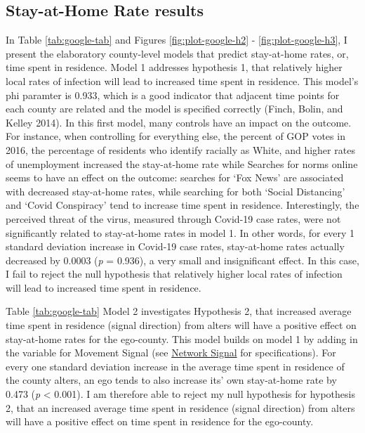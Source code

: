 \hypertarget{stay-at-home-rate-results}{%
\subsection{Stay-at-Home Rate results}\label{stay-at-home-rate-results}}




In Table \ref{tab:google-tab} and Figures \ref{fig:plot-google-h2} -
\ref{fig:plot-google-h3}, I present the elaboratory county-level models that
predict stay-at-home rates, or, time spent in residence. Model 1 addresses
hypothesis 1, that relatively higher local rates of infection will lead to
increased time spent in residence. This model's phi paramter is 0.933, which is
a good indicator that adjacent time points for each county are related and the
model is specified correctly (Finch, Bolin, and Kelley 2014). In this first model, many controls
have an impact on the outcome. For instance, when controlling for everything
else, the percent of GOP votes in 2016, the percentage of residents who identify
racially as White, and higher rates of unemployment increased the stay-at-home
rate while Searches for norms online seems to
have an effect on the outcome: searches for `Fox News' are associated with
decreased stay-at-home rates, while searching for both `Social Distancing' and
`Covid Conspiracy' tend to increase time spent in residence. Interestingly, the
perceived threat of the virus, measured through Covid-19 case rates, were not
significantly related to stay-at-home rates in model 1. In other words, for
every 1 standard deviation increase in Covid-19 case rates, stay-at-home rates
actually decreased by
0.0003 (\emph{p} = 0.936),
a very small and insignificant effect. In this case, I fail to reject the null
hypothesis that relatively higher local rates of infection will lead to
increased time spent in residence.

Table \ref{tab:google-tab} Model 2 investigates Hypothesis 2, that increased
average time spent in residence (signal direction) from alters will have a
positive effect on stay-at-home rates for the ego-county. This model builds on
model 1 by adding in the variable for Movement Signal (see \protect\hyperlink{network-signal}{Network
Signal} for specifications). For every one standard deviation
increase in the average time spent in residence of the county alters, an ego tends to also increase its' own stay-at-home rate by
0.473
(\emph{p} \textless{} 0.001). I am therefore able to reject my null hypothesis for hypothesis
2, that an increased average time spent in residence (signal direction) from
alters will have a positive effect on time spent in residence for the
ego-county.

